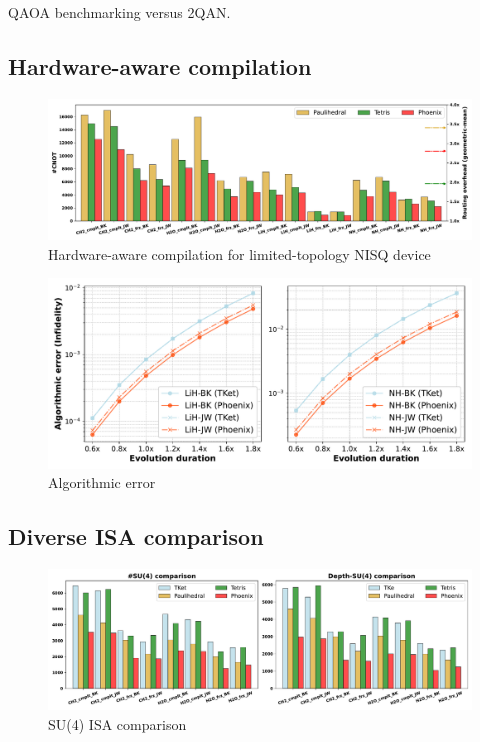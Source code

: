 \documentclass[conference]{IEEEtran}
\begin{document}
\begin{table}[btp]
    \centering
    \caption{QAOA benchmarking versus 2QAN.}
    \setlength{\tabcolsep}{3.8pt}
    \scalebox{0.78}{
        
    }
    \label{tab:qaoa}
\end{table}


\subsection{Hardware-aware compilation}


\begin{figure}[tbp]
    \centering
    \includegraphics[width=\columnwidth]{figures/num_2q_gates_manhattan.pdf}
    \caption{Hardware-aware compilation for limited-topology NISQ device}
    \label{fig:manhattan}
\end{figure}


\begin{figure}[tbp]
    \centering
    \includegraphics[width=\columnwidth]{figures/algo_err.pdf}
    \caption{Algorithmic error}
    \label{fig:algo-err}
\end{figure}




\subsection{Diverse ISA comparison}


\begin{figure}[tbp]
    \centering
    \includegraphics[width=\columnwidth]{figures/su4_comparison.pdf}
    \caption{SU(4) ISA comparison}
    \label{fig:su4-isa}
\end{figure}
\end{document}
